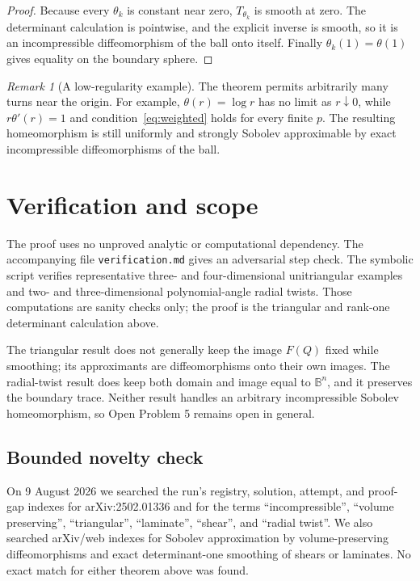 \documentclass[11pt]{article}
\theoremstyle{remark}
\newtheorem{remark}[theorem]{Remark}
\newcommand{\B}{\mathbb{B}}
\begin{document}
\begin{proof}
Because every $\theta_k$ is constant near zero, $T_{\theta_k}$ is smooth at
zero.  The determinant calculation is pointwise, and the explicit inverse is
smooth, so it is an incompressible diffeomorphism of the ball onto itself.
Finally $\theta_k(1)=\theta(1)$ gives equality on the boundary sphere.
\end{proof}

\begin{remark}[A low-regularity example]
The theorem permits arbitrarily many turns near the origin.  For example,
$\theta(r)=\log r$ has no limit as $r\downarrow0$, while
$r\theta'(r)=1$ and condition~\eqref{eq:weighted} holds for every finite
$p$.  The resulting homeomorphism is still uniformly and strongly Sobolev
approximable by exact incompressible diffeomorphisms of the ball.
\end{remark}

\section{Verification and scope}

The proof uses no unproved analytic or computational dependency.  The
accompanying file \texttt{verification.md} gives an adversarial step check.
The symbolic script  verifies representative
three- and four-dimensional unitriangular examples and two- and
three-dimensional polynomial-angle radial twists.  Those computations are
sanity checks only; the proof is the triangular and rank-one determinant
calculation above.

The triangular result does not generally keep the image $F(Q)$ fixed while
smoothing; its approximants are diffeomorphisms onto their own images.  The
radial-twist result does keep both domain and image equal to $\B^n$, and it
preserves the boundary trace.  Neither result handles an arbitrary
incompressible Sobolev homeomorphism, so Open Problem 5 remains open in
general.

\subsection*{Bounded novelty check}

On 9 August 2026 we searched the run's registry, solution, attempt, and
proof-gap indexes for arXiv:2502.01336 and for the terms ``incompressible'',
``volume preserving'', ``triangular'', ``laminate'', ``shear'', and ``radial
twist''.  We also searched arXiv/web indexes for Sobolev approximation by
volume-preserving diffeomorphisms and exact determinant-one smoothing of
shears or laminates.  No exact match for either theorem above was found.
\end{document}
